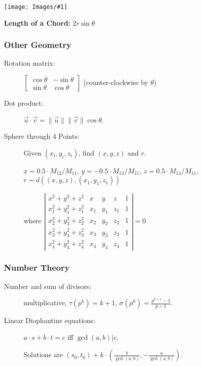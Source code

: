 \documentclass[landscape,10pt]{article}
\newcommand{\myimage}[2]{\begin{center}\texttt{[image: Images/\#1]}\end{center}}
\begin{document}
\begin{multicols*}{2}
\myimage{TrigCircle.pdf}{1.5in}

{\bf Length of a Chord:} $2r\sin\theta$

\subsubsection*{Other Geometry}

\begin{description}
\item[Rotation matrix:] 
  $\begin{bmatrix} \cos \theta & -\sin \theta \\
  \sin \theta & \cos \theta \end{bmatrix}$ (counter-clockwise by $\theta$)
\item[Dot product:] $\vec u \cdot \vec v = \|\vec u\| \|\vec v\| \cos \theta$.
\item[Sphere through 4 Points:] Given $(x_i,y_i,z_i)$, find $(x,y,z)$ and $r$.

$x = 0.5 \cdot M_{12}/M_{11}$, $y = -0.5 \cdot M_{13}/M_{11}$, $z = 0.5 \cdot M_{14}/M_{11}$, $r = d((x,y,z),(x_1,y_1,z_1))$

where
$\left|\begin{array}{ccccc}
x^2+y^2+z^2 & x & y & z & 1 \\
x_1^2+y_1^2+z_1^2 & x_1 & y_1 & z_1 & 1 \\
x_2^2+y_2^2+z_2^2 & x_2 & y_2 & z_2 & 1 \\
x_3^2+y_3^2+z_3^2 & x_3 & y_3 & z_3 & 1 \\
x_4^2+y_4^2+z_4^2 & x_4 & y_4 & z_4 & 1
\end{array}\right| = 0$
\end{description}

\subsubsection*{Number Theory}

\begin{description}
\item[Number and sum of divisors:] multiplicative, $\tau(p^k) = k+1$,
 $\sigma(p^k) = \frac{p^{k+1}-1}{p-1}$.
\item[Linear Diophantine equations:] $a\cdot s + b\cdot t = c$ iff
  $\gcd(a,b) | c$. 

Solutions are $(s_0, t_0) + k \cdot \left(\frac{b}{\gcd(a,b)}, -\frac{a}{\gcd(a,b)}\right)$.
\end{description}


\end{multicols*}
\end{document}
